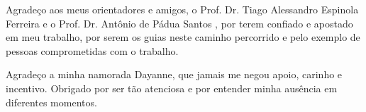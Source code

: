 Agradeço aos meus orientadores e amigos, o Prof. Dr. Tiago Alessandro Espinola Ferreira e o Prof. Dr. Antônio de Pádua Santos , por terem confiado e apostado em meu trabalho, por serem os guias neste caminho percorrido e pelo exemplo de pessoas comprometidas com o trabalho.

Agradeço a minha namorada Dayanne, que jamais me negou apoio, carinho e incentivo. Obrigado por ser tão atenciosa e por entender minha ausência em diferentes momentos.